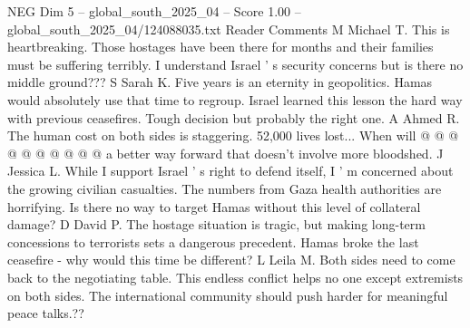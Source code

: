 \begin{textsample}{NEG Dim 5 – global\_south\_2025\_04 – Score 1.00 – global\_south\_2025\_04/124088035.txt}
Reader Comments M Michael T.
This is heartbreaking.
Those hostages have been there for months and their families must be suffering terribly.
I understand Israel ' s security concerns but is there no middle ground???
S Sarah K.
Five years is an eternity in geopolitics.
Hamas would absolutely use that time to regroup.
Israel learned this lesson the hard way with previous ceasefires.
Tough decision but probably the right one.
A Ahmed R.
The human cost on both sides is staggering. 52,000 lives lost...
When will @ @ @ @ @ @ @ @ @ @ a better way forward that doesn't involve more bloodshed.
J Jessica L.
While I support Israel ' s right to defend itself, I ' m concerned about the growing civilian casualties.
The numbers from Gaza health authorities are horrifying.
Is there no way to target Hamas without this level of collateral damage?
D David P.
The hostage situation is tragic, but making long-term concessions to terrorists sets a dangerous precedent.
Hamas broke the last ceasefire - why would this time be different?
L Leila M.
Both sides need to come back to the negotiating table.
This endless conflict helps no one except extremists on both sides.
The international community should push harder for meaningful peace talks.??

\end{textsample}
